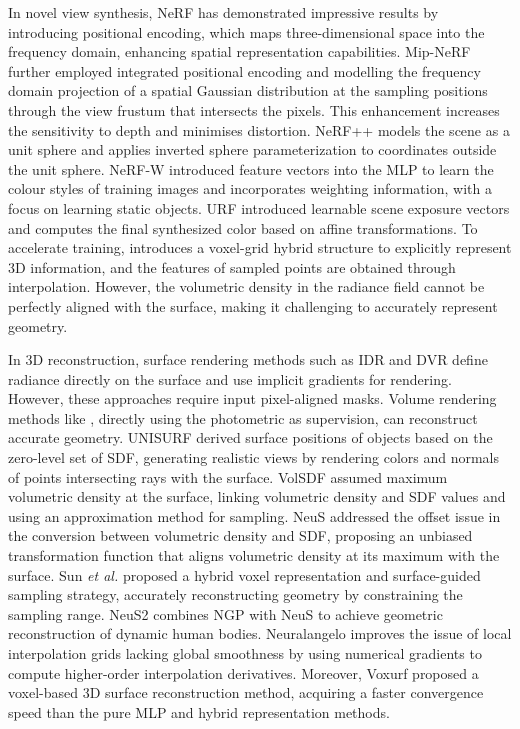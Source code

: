 In novel view synthesis, NeRF\cite{mildenhall2021nerf} has demonstrated impressive results by introducing positional encoding, which maps three-dimensional space into the frequency domain, enhancing spatial representation capabilities. Mip-NeRF\cite{barron2021mipnerf} further employed integrated positional encoding and modelling the frequency domain projection of a spatial Gaussian distribution at the sampling positions through the view frustum that intersects the pixels. This enhancement increases the sensitivity to depth and minimises distortion. NeRF++\cite{kaizhang2020} models the scene as a unit sphere and applies inverted sphere parameterization to coordinates outside the unit sphere. NeRF-W\cite{martin2021nerfw} introduced feature vectors into the MLP to learn the colour styles of training images and incorporates weighting information, with a focus on learning static objects. URF\cite{rematas2022urban} introduced learnable scene exposure vectors and computes the final synthesized color based on affine transformations. To accelerate training, \cite{yu2022plenoxel,mueller2022instant,sun2022dvgo} introduces a voxel-grid hybrid structure to explicitly represent 3D information, and the features of sampled points are obtained through interpolation. However, the volumetric density in the radiance field cannot be perfectly aligned with the surface, making it challenging to accurately represent geometry.

In 3D reconstruction, surface rendering methods such as IDR\cite{yariv2020multiview} and DVR\cite{Niemeyer2019DifferentiableVR} define radiance directly on the surface and use implicit gradients for rendering. However, these approaches require input pixel-aligned masks. Volume rendering methods like \cite{Oechsle2021unisurf,yariv2021volsdf,wang2021neus}, directly using the photometric as supervision, can reconstruct accurate geometry. UNISURF\cite{Oechsle2021unisurf} derived surface positions of objects based on the zero-level set of SDF, generating realistic views by rendering colors and normals of points intersecting rays with the surface. VolSDF\cite{yariv2021volsdf} assumed maximum volumetric density at the surface, linking volumetric density and SDF values and using an approximation method for sampling. NeuS\cite{wang2021neus} addressed the offset issue in the conversion between volumetric density and SDF, proposing an unbiased transformation function that aligns volumetric density at its maximum with the surface. Sun \textit{et al.}\cite{Sun2022Neural3R} proposed a hybrid voxel representation and surface-guided sampling strategy, accurately reconstructing geometry by constraining the sampling range. NeuS2\cite{Wang2022NeuS2} combines NGP\cite{mueller2022instant} with NeuS to achieve geometric reconstruction of dynamic human bodies. Neuralangelo\cite{li2023neuralangelo} improves the issue of local interpolation grids lacking global smoothness by using numerical gradients to compute higher-order interpolation derivatives. Moreover, Voxurf\cite{wu2022voxurf} proposed a voxel-based 3D surface reconstruction method, acquiring a faster convergence speed than the pure MLP and hybrid representation methods.

